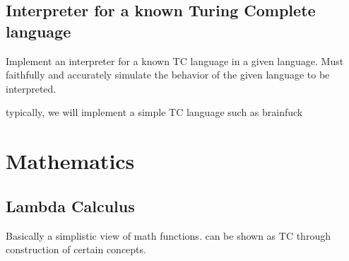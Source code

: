 \subsection{Interpreter for a known Turing Complete language}

Implement an interpreter for a known TC language in a given language.
Must faithfully and accurately simulate the behavior of the given language to be interpreted.

typically, we will implement a simple TC language such as brainfuck

\section{Mathematics}

\subsection{Lambda Calculus}

Basically a simplistic view of math functions.
can be shown as TC through construction of certain concepts.